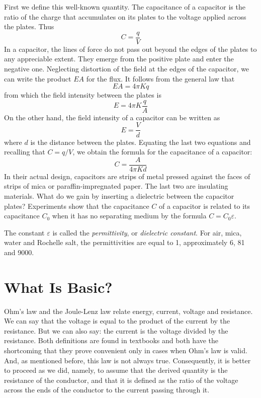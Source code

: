 First we define this well-known quantity. The capacitance of a capacitor is the ratio of the charge that accumulates on its plates to the voltage applied across the plates. Thus
\begin{equation*}%
C  = \frac{q}{V}
\end{equation*}
In a capacitor, the lines of force do not pass out beyond the edges of the plates to any appreciable extent. They emerge from the positive plate and enter the negative one. Neglecting distortion of the field at the edges of the capacitor, we can write the product $EA$ for the flux. It follows from the general law that
\begin{equation*}%
EA = 4 \pi K q
\end{equation*}
from which the field intensity between the plates is
\begin{equation*}%
E  = 4 \pi K \frac{q}{A}
\end{equation*}
On the other hand, the field intensity of a capacitor can
be written as
\begin{equation*}%
E  = \frac{V}{d}
\end{equation*}
where $d$ is the distance between the plates. Equating the last two equations and recalling that $C=q/V$, we obtain the formula for the capacitance of a capacitor:
\begin{equation*}%
C  = \frac{A}{4 \pi Kd}
\end{equation*}
In their actual design, capacitors are strips of metal pressed against the faces of strips of mica or paraffin-impregnated paper. The last two are insulating materials. What do we gain by inserting a dielectric between the capacitor plates? Experiments show that the capacitance $C$ of a capacitor is related to its capacitance $C_{0}$ when it has no separating medium by the formula $C=C_{0}\varepsilon$.

The constant $\varepsilon$ is called the \emph{permittivity}, or \emph{dielectric constant}. For air, mica, water and Rochelle salt, the permittivities are equal to 1, approximately 6, 81 and 9000.

\section{What Is Basic?}

Ohm's law and the Joule-Lenz law relate energy, current, voltage and resistance. We can say that the voltage is equal to the product of the current by the resistance. But we can also say: the current is the voltage divided by the resistance. Both definitions are found in textbooks and both have the shortcoming that they
prove convenient only in cases when Ohm's law is valid. And, as mentioned before, this law is not always true. Consequently, it is better to proceed as we did, namely, to assume that the derived quantity is the resistance of the conductor, and that it is defined as the ratio of the voltage across the ends of the conductor to the current passing through it.

